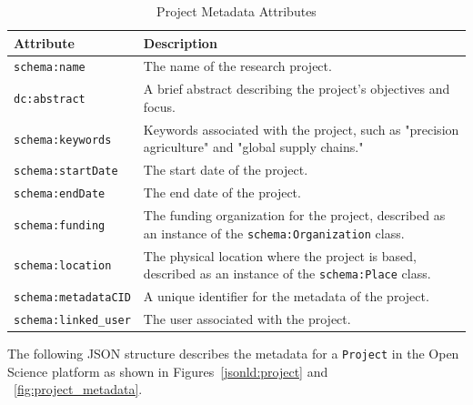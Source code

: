\documentclass[final]{rc-book-2.14}
\begin{document}
\begin{table}[h]
    \centering
    \label{tab:project_metadata}
    \renewcommand{\arraystretch}{1.2}
    \begin{tabularx}{\textwidth}{|l|X|}
        \hline
        \textbf{Attribute}           & \textbf{Description}                                                                                           \\ \hline
        \texttt{schema:name}         & The name of the research project.                                                                              \\ \hline
        \texttt{dc:abstract}         & A brief abstract describing the project's objectives and focus.                                                \\ \hline
        \texttt{schema:keywords}     & Keywords associated with the project, such as "precision agriculture" and "global supply chains."              \\ \hline
        \texttt{schema:startDate}    & The start date of the project.                                                                                 \\ \hline
        \texttt{schema:endDate}      & The end date of the project.                                                                                   \\ \hline
        \texttt{schema:funding}      & The funding organization for the project, described as an instance of the \texttt{schema:Organization} class.  \\ \hline
        \texttt{schema:location}     & The physical location where the project is based, described as an instance of the \texttt{schema:Place} class. \\ \hline
        \texttt{schema:metadataCID}  & A unique identifier for the metadata of the project.                                                           \\ \hline
        \texttt{schema:linked\_user} & The user associated with the project.                                                                          \\ \hline
    \end{tabularx}
    \caption{Project Metadata Attributes}
\end{table}

The following JSON structure describes the metadata for a \texttt{Project} in the Open Science platform as shown in Figures~\ref{jsonld:project} and ~\ref{fig:project_metadata}.
\end{document}
